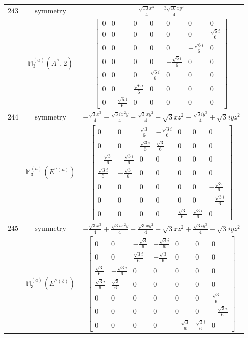 \documentclass[fleqn,8pt,landscape]{jsarticle}
\begin{document}
\begin{longtable}{ccc}
$ 243 $ & $ \text{symmetry} $ & $ \frac{\sqrt{10} x^{3}}{4} - \frac{3 \sqrt{10} x y^{2}}{4} $ \\
$  $ & $ \mathbb{M}_{3}^{(a)}(A^{\prime\prime},2) $ & $ \begin{bmatrix} 0 & 0 & 0 & 0 & 0 & 0 & 0 \\ 0 & 0 & 0 & 0 & 0 & 0 & \frac{\sqrt{6} i}{6} \\ 0 & 0 & 0 & 0 & 0 & - \frac{\sqrt{6} i}{6} & 0 \\ 0 & 0 & 0 & 0 & - \frac{\sqrt{6} i}{6} & 0 & 0 \\ 0 & 0 & 0 & \frac{\sqrt{6} i}{6} & 0 & 0 & 0 \\ 0 & 0 & \frac{\sqrt{6} i}{6} & 0 & 0 & 0 & 0 \\ 0 & - \frac{\sqrt{6} i}{6} & 0 & 0 & 0 & 0 & 0 \end{bmatrix} $ \\ \hline
$ 244 $ & $ \text{symmetry} $ & $ - \frac{\sqrt{3} x^{3}}{4} - \frac{\sqrt{3} i x^{2} y}{4} - \frac{\sqrt{3} x y^{2}}{4} + \sqrt{3} x z^{2} - \frac{\sqrt{3} i y^{3}}{4} + \sqrt{3} i y z^{2} $ \\
$  $ & $ \mathbb{M}_{3}^{(a)}(E^{\prime\prime(a)}) $ & $ \begin{bmatrix} 0 & 0 & \frac{\sqrt{3}}{6} & - \frac{\sqrt{3} i}{6} & 0 & 0 & 0 \\ 0 & 0 & \frac{\sqrt{3} i}{6} & \frac{\sqrt{3}}{6} & 0 & 0 & 0 \\ - \frac{\sqrt{3}}{6} & - \frac{\sqrt{3} i}{6} & 0 & 0 & 0 & 0 & 0 \\ \frac{\sqrt{3} i}{6} & - \frac{\sqrt{3}}{6} & 0 & 0 & 0 & 0 & 0 \\ 0 & 0 & 0 & 0 & 0 & 0 & - \frac{\sqrt{3}}{6} \\ 0 & 0 & 0 & 0 & 0 & 0 & - \frac{\sqrt{3} i}{6} \\ 0 & 0 & 0 & 0 & \frac{\sqrt{3}}{6} & \frac{\sqrt{3} i}{6} & 0 \end{bmatrix} $ \\ \hline
$ 245 $ & $ \text{symmetry} $ & $ - \frac{\sqrt{3} x^{3}}{4} + \frac{\sqrt{3} i x^{2} y}{4} - \frac{\sqrt{3} x y^{2}}{4} + \sqrt{3} x z^{2} + \frac{\sqrt{3} i y^{3}}{4} - \sqrt{3} i y z^{2} $ \\
$  $ & $ \mathbb{M}_{3}^{(a)}(E^{\prime\prime(b)}) $ & $ \begin{bmatrix} 0 & 0 & - \frac{\sqrt{3}}{6} & - \frac{\sqrt{3} i}{6} & 0 & 0 & 0 \\ 0 & 0 & \frac{\sqrt{3} i}{6} & - \frac{\sqrt{3}}{6} & 0 & 0 & 0 \\ \frac{\sqrt{3}}{6} & - \frac{\sqrt{3} i}{6} & 0 & 0 & 0 & 0 & 0 \\ \frac{\sqrt{3} i}{6} & \frac{\sqrt{3}}{6} & 0 & 0 & 0 & 0 & 0 \\ 0 & 0 & 0 & 0 & 0 & 0 & \frac{\sqrt{3}}{6} \\ 0 & 0 & 0 & 0 & 0 & 0 & - \frac{\sqrt{3} i}{6} \\ 0 & 0 & 0 & 0 & - \frac{\sqrt{3}}{6} & \frac{\sqrt{3} i}{6} & 0 \end{bmatrix} $ \\ \hline

\end{longtable}
\end{document}
